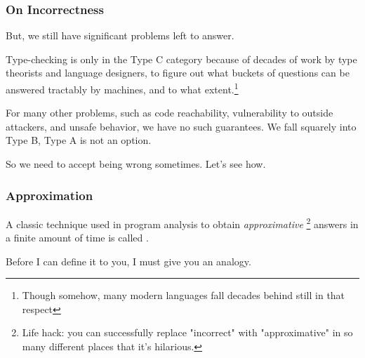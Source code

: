 \documentclass[aspectratio=169, handout]{beamer}
\begin{document}





\begin{frame}[fragile]
  \frametitle{On Incorrectness}

  But, we still have significant problems left to answer.

  \pause
  \vspace{\fill}

  Type-checking is only in the Type C category because of decades of work by type theorists
  and language designers, to figure out what buckets of questions can be answered tractably
  by machines, and to what extent.\footnote{Though somehow, many modern languages fall decades
  behind still in that respect}

  \pause
  \vspace{\fill}

  For many other problems, such as code reachability, vulnerability to outside
  attackers, and unsafe behavior, we have no such guarantees. We fall squarely into
  Type B, Type A is not an option.

  \pause
  \vspace{\fill}

  So we need to accept being wrong sometimes. Let's see how.
\end{frame}


\begin{frame}[fragile]
  \frametitle{Approximation}

  A classic technique used in program analysis to obtain \textit{approximative}
  \footnote{Life hack: you can successfully replace "incorrect" with
  "approximative" in so many different places that it's hilarious.} answers
  in a finite amount of time is called .

  \pause
  \vspace{\fill}

  Before I can define it to you, I must give you an analogy.

\end{frame}
\end{document}
